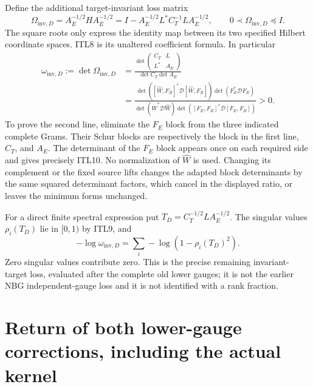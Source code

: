 \documentclass[11pt,a4paper]{article}
\begin{document}
Define the additional target-invariant loss matrix
\[
 \Omega_{\mathrm{inv},D}
   =A_E^{-1/2}H A_E^{-1/2}
   =I-A_E^{-1/2}L^*C_T^{-1}L A_E^{-1/2},\qquad
                    0\prec\Omega_{\mathrm{inv},D}\preceq I .
                                                        \tag{ITL9}
\]
The square roots only express the identity map between its two
specified Hilbert coordinate spaces. ITL8 is its unaltered
coefficient formula. In particular
\[
 \begin{split}
 \omega_{\mathrm{inv},D}:=\det\Omega_{\mathrm{inv},D}
 &=\frac{\det\begin{pmatrix}C_T&L\\L^*&A_E\end{pmatrix}}
          {\det C_T\det A_E}\\
 &=\frac{\det([\widehat W,F_R]^*\mathcal D[\widehat W,F_R])
              \det(F_E^*\mathcal D F_E)}
          {\det(\widehat W^*\mathcal D\widehat W)
              \det([F_E,F_R]^*\mathcal D[F_E,F_R])}>0 .
                                                        \end{split} \tag{ITL10}
\]
To prove the second line, eliminate the $F_E$ block from the
three indicated complete Grams. Their Schur blocks are
respectively the block in the first line, $C_T$, and $A_E$.
The determinant of the $F_E$ block appears once on each
required side and gives precisely ITL10. No normalization
of $\widehat W$ is used. Changing its complement or the
fixed source lifts changes the adapted block determinants
by the same squared determinant factors, which cancel in
the displayed ratio, or leaves the minimum forms unchanged.

For a direct finite spectral expression put
$T_D=C_T^{-1/2}L A_E^{-1/2}$. The singular values
$\rho_i(T_D)$ lie in $[0,1)$ by ITL9, and
\[
 -\log\omega_{\mathrm{inv},D}
       =\sum_i-\log(1-\rho_i(T_D)^2).             \tag{ITL11}
\]
Zero singular values contribute zero. This is the precise
remaining invariant-target loss, evaluated after the complete
old lower gauges; it is not the earlier NBG independent-gauge
loss and it is not identified with a rank fraction.

\section{Return of both lower-gauge corrections, including the actual kernel}
\end{document}
